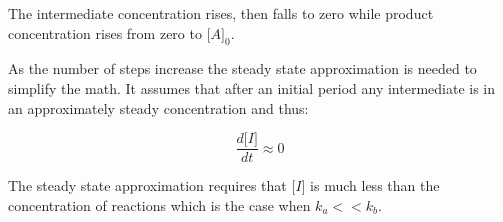 \documentclass[a4paper, 12 pt]{article}
\newcommand{\conc}[1]{\lbrack #1 \rbrack}
\newcommand{\deriv}[2]{\frac{d #1}{d #2}}
\begin{document}
\begin{flushleft}
The intermediate concentration rises, then falls to zero while product concentration rises from zero to $\conc{A}_0$. 

As the number of steps increase the steady state approximation is needed to simplify the math. It assumes that after an initial period any intermediate is in an approximately steady concentration and thus:

\begin{equation*}
    \deriv{\conc{I}}{t} \approx 0
\end{equation*}

The steady state approximation requires that $\conc{I}$ is much less than the concentration of reactions which is the case when $k_a << k_b$.

\end{flushleft}
\end{document}

